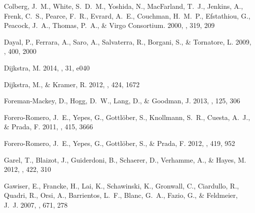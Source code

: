 \documentclass{emulateapj}
\begin{document}
\begin{thebibliography}{43}
{Colberg}, J.~M., {White}, S.~D.~M., {Yoshida}, N., {MacFarland}, T.~J.,
  {Jenkins}, A., {Frenk}, C.~S., {Pearce}, F.~R., {Evrard}, A.~E., {Couchman},
  H.~M.~P., {Efstathiou}, G., {Peacock}, J.~A., {Thomas}, P.~A., \& {Virgo
  Consortium}. 2000, \mnras, 319, 209

{Dayal}, P., {Ferrara}, A., {Saro}, A., {Salvaterra}, R., {Borgani}, S., \&
  {Tornatore}, L. 2009, \mnras, 400, 2000

{Dijkstra}, M. 2014, \pasa, 31, e040

{Dijkstra}, M., \& {Kramer}, R. 2012, \mnras, 424, 1672

{Foreman-Mackey}, D., {Hogg}, D.~W., {Lang}, D., \& {Goodman}, J. 2013, \pasp,
  125, 306

{Forero-Romero}, J.~E., {Yepes}, G., {Gottl{\"o}ber}, S., {Knollmann}, S.~R.,
  {Cuesta}, A.~J., \& {Prada}, F. 2011, \mnras, 415, 3666

{Forero-Romero}, J.~E., {Yepes}, G., {Gottl{\"o}ber}, S., \& {Prada}, F. 2012,
  \mnras, 419, 952

{Garel}, T., {Blaizot}, J., {Guiderdoni}, B., {Schaerer}, D., {Verhamme}, A.,
  \& {Hayes}, M. 2012, \mnras, 422, 310

{Gawiser}, E., {Francke}, H., {Lai}, K., {Schawinski}, K., {Gronwall}, C.,
  {Ciardullo}, R., {Quadri}, R., {Orsi}, A., {Barrientos}, L.~F., {Blanc},
  G.~A., {Fazio}, G., \& {Feldmeier}, J.~J. 2007{}, \apj, 671, 278


\end{thebibliography}
\end{document}
